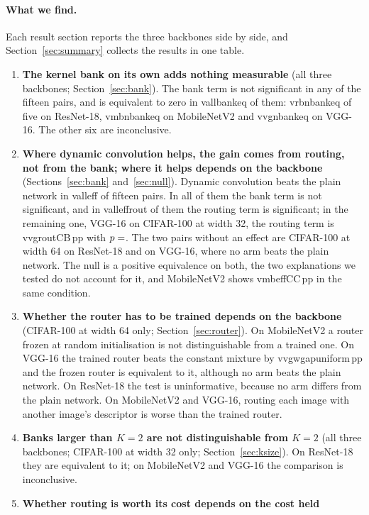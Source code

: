 \documentclass[10pt,a4paper]{article}
\newcommand{\V}[1]{\csname v#1\endcsname}
\begin{document}
\paragraph{What we find.} Each result section reports the three backbones
side by side, and Section~\ref{sec:summary} collects the results in one
table.
\begin{enumerate}\setlength\itemsep{2pt}
\item \textbf{The kernel bank on its own adds nothing measurable} (all
three backbones; Section~\ref{sec:bank}). The bank term is not
significant in any of the fifteen pairs, and is equivalent to zero in
\V{allbankeq} of them: \V{rbnbankeq} of five on ResNet-18, \V{mbnbankeq} on
MobileNetV2 and \V{vgnbankeq} on VGG-16. The other six are inconclusive.
\item \textbf{Where dynamic convolution helps, the gain comes from
routing, not from the bank; where it helps depends on the backbone}
(Sections~\ref{sec:bank} and~\ref{sec:null}). Dynamic convolution beats
the plain network in \V{alleff} of fifteen pairs. In all of them the bank
term is not significant, and in \V{alleffrout} of them the routing term is
significant; in the remaining one, VGG-16 on CIFAR-100 at width 32, the
routing term is \V{vgroutCB}\,pp with $p=\V{vgroutCBp}$. The two pairs
without an effect are CIFAR-100 at width 64 on ResNet-18 and on VGG-16,
where no arm beats the plain network. The null is a positive equivalence
on both, the two explanations we tested do not account for it, and
MobileNetV2 shows \V{mbeffCC}\,pp in the same condition.
\item \textbf{Whether the router has to be trained depends on the
backbone} (CIFAR-100 at width 64 only; Section~\ref{sec:router}). On
MobileNetV2 a router frozen at random initialisation is not
distinguishable from a trained one. On VGG-16 the trained router beats
the constant mixture by \V{vgwgapuniform}\,pp and the frozen router is
equivalent to it, although no arm beats the plain network. On ResNet-18
the test is uninformative, because no arm differs from the plain network.
On MobileNetV2 and VGG-16, routing each image with another image's
descriptor is worse than the trained router.
\item \textbf{Banks larger than $K=2$ are not distinguishable from $K=2$}
(all three backbones; CIFAR-100 at width 32 only;
Section~\ref{sec:ksize}). On ResNet-18 they are equivalent to it; on
MobileNetV2 and VGG-16 the comparison is inconclusive.
\item \textbf{Whether routing is worth its cost depends on the cost held
}
\end{enumerate}
\end{document}
